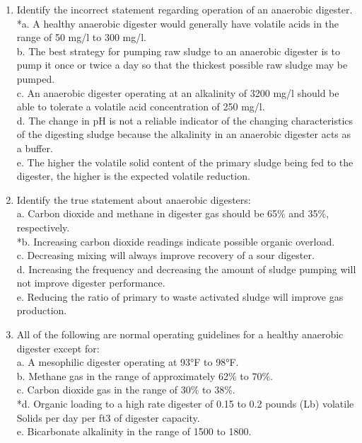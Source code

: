 \documentclass{article}
\begin{document}
\begin{enumerate}
\item  Identify the incorrect statement regarding operation of an anaerobic digester. \\

*a. A healthy anaerobic digester would generally have volatile acids in the range of 50 mg/l to 300 mg/l. \\
b. The best strategy for pumping raw sludge to an anaerobic digester is to pump it once or twice a day so that the thickest possible raw sludge may be pumped. \\
c. An anaerobic digester operating at an alkalinity of 3200 mg/l should be able to tolerate a volatile acid concentration of 250 mg/l. \\
d. The change in pH is not a reliable indicator of the changing characteristics of the digesting sludge because the alkalinity in an anaerobic digester acts as a buffer. \\
e. The higher the volatile solid content of the primary sludge being fed to the digester, the higher is the expected volatile reduction. \\

\item  Identify the true statement about anaerobic digesters: \\

a. Carbon dioxide and methane in digester gas should be 65\% and 35\%, respectively. \\
*b. Increasing carbon dioxide readings indicate possible organic overload. \\
c. Decreasing mixing will always improve recovery of a sour digester. \\
d. Increasing the frequency and decreasing the amount of sludge pumping will not improve digester performance. \\
e. Reducing the ratio of primary to waste activated sludge will improve gas production. \\

\item  All of the following are normal operating guidelines for a healthy anaerobic digester except for: \\

a. A mesophilic digester operating at 93°F to 98°F. \\
b. Methane gas in the range of approximately 62\% to 70\%. \\
c. Carbon dioxide gas in the range of 30\% to 38\%. \\
*d. Organic loading to a high rate digester of 0.15 to 0.2 pounds (Lb) volatile Solids per day per ft3 of digester capacity. \\
e. Bicarbonate alkalinity in the range of 1500 to 1800. \\


\end{enumerate}
\end{document}

